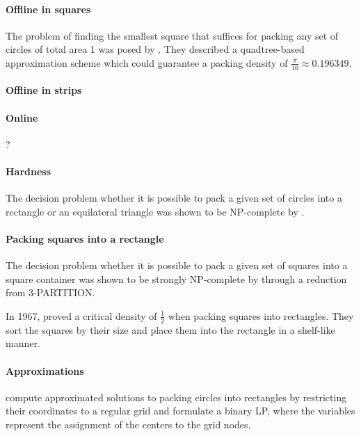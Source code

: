 \paragraph{Offline in squares}

The problem of finding the smallest square that suffices for packing any set of circles of total area 1 was posed by \cite{DFL2010circle}. They described a quadtree-based approximation scheme which could guarantee a packing density of $\frac{\pi}{16} \approx 0.196349$.

\paragraph{Offline in strips}

\paragraph{Online}

?

\paragraph{Hardness}

The decision problem whether it is possible to pack a given set of circles into a rectangle or an equilateral triangle was shown to be NP-complete by \cite{DFL2010circle}.

\paragraph{Packing squares into a rectangle}

The decision problem whether it is possible to pack a given set of squares into a square container was shown to be strongly NP-complete by \cite{LTWYC1990packing} through a reduction from \textsc{3-PARTITION}.

In 1967, \cite{MM1967some} proved a critical density of $\frac{1}{2}$ when packing squares into rectangles. They sort the squares by their size and place them into the rectangle in a shelf-like manner.


\paragraph{Approximations}

\cite{LIE2014approximate} compute approximated solutions to packing circles into rectangles by restricting their coordinates to a regular grid and formulate a binary LP, where the variables represent the assignment of the centers to the grid nodes.

